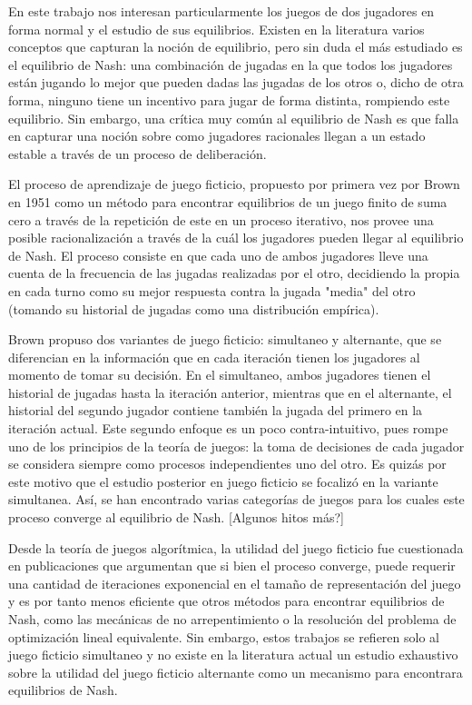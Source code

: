 En este trabajo nos interesan particularmente los juegos de dos jugadores en forma normal y el estudio de sus equilibrios. Existen en la literatura varios conceptos que capturan la noción de equilibrio, pero sin duda el más estudiado es el equilibrio de Nash: una combinación de jugadas en la que todos los jugadores están jugando lo mejor que pueden dadas las jugadas de los otros o, dicho de otra forma, ninguno tiene un incentivo para jugar de forma distinta, rompiendo este equilibrio. Sin embargo, una crítica muy común al equilibrio de Nash es que falla en capturar una noción sobre como jugadores racionales llegan a un estado estable a través de un proceso de deliberación.

El proceso de aprendizaje de juego ficticio, propuesto por primera vez por Brown en 1951 \cite{brown:1951} como un método para encontrar equilibrios de un juego finito de suma cero \cite{libro:rubinstein} a través de la repetición de este en un proceso iterativo, nos provee una posible racionalización a través de la cuál los jugadores pueden llegar al equilibrio de Nash. El proceso consiste en que cada uno de ambos jugadores lleve una cuenta de la frecuencia de las jugadas realizadas por el otro, decidiendo la propia en cada turno como su mejor respuesta contra la jugada "media" del otro (tomando su historial de jugadas como una distribución empírica). 

Brown propuso dos variantes de juego ficticio: simultaneo y alternante, que se diferencian en la información que en cada iteración tienen los jugadores al momento de tomar su decisión. En el simultaneo, ambos jugadores tienen el historial de jugadas hasta la iteración anterior, mientras que en el alternante, el historial del segundo jugador contiene también la jugada del primero en la iteración actual. Este segundo enfoque es un poco contra-intuitivo, pues rompe uno de los principios de la teoría de juegos: la toma de decisiones de cada jugador se considera siempre como procesos independientes uno del otro. Es quizás por este motivo que el estudio posterior en juego ficticio se focalizó en la variante simultanea. Así, se han encontrado varias categorías de juegos para los cuales este proceso converge al equilibrio de Nash. [Algunos hitos más?]

Desde la teoría de juegos algorítmica, la utilidad del juego ficticio fue cuestionada en publicaciones que argumentan que si bien el proceso converge, puede requerir una cantidad de iteraciones exponencial en el tamaño de representación del juego y es por tanto menos eficiente que otros métodos para encontrar equilibrios de Nash, como las mecánicas de no arrepentimiento o la resolución del problema de optimización lineal equivalente. Sin embargo, estos trabajos se refieren solo al juego ficticio simultaneo y no existe en la literatura actual un estudio exhaustivo sobre la utilidad del juego ficticio alternante como un mecanismo para encontrara equilibrios de Nash.

